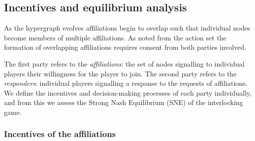 \begin{subappendices}
%

\subsection{Incentives and equilibrium analysis}

As the hypergraph evolves affiliations begin to overlap such that individual nodes become members of multiple affiliations. As noted from the action set the formation of overlapping affiliations requires consent from both parties involved.

The first party refers to the \emph{affiliations}: the set of nodes signalling to individual players their willingness for the player to join. The second party refers to the \emph{responders}: individual players signalling a response to the requests of affiliations. We define the incentives and decision-making processes of each party individually, and from this we assess the Strong Nash Equilibrium (SNE) of the interlocking game.

\subsubsection*{Incentives of the affiliations}


\end{subappendices}
